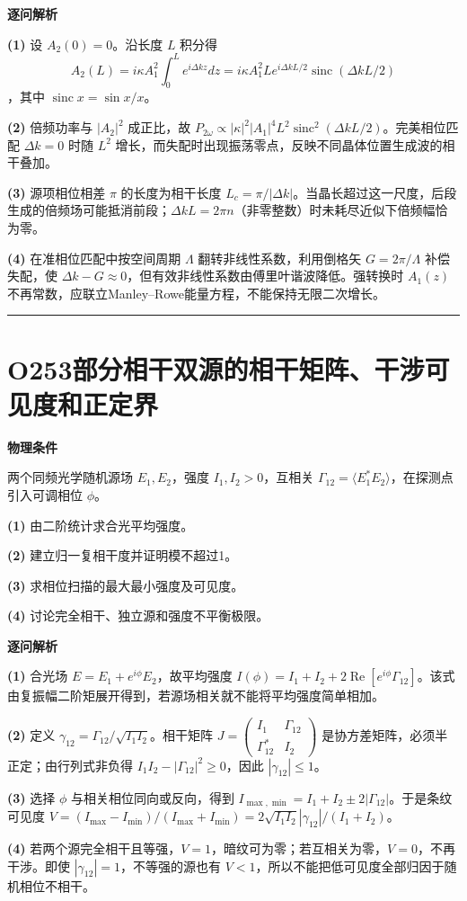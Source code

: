 \documentclass[UTF8,a4paper,11pt,oneside,openany]{ctexbook}
\begin{document}
\par\medskip\noindent\textbf{逐问解析}
\par\noindent\textbf{(1)} 设 \(A_2(0)=0\)。沿长度 \(L\) 积分得 \[A_2(L)=i\kappa A_1^2\int_0^L e^{i\Delta kz}dz=i\kappa A_1^2 L e^{i\Delta kL/2}\operatorname{sinc}(\Delta kL/2)\]，其中 \(\operatorname{sinc}x=\sin x/x\)。
\par\noindent\textbf{(2)} 倍频功率与 \(|A_2|^2\) 成正比，故 \(P_{2\omega}\propto|\kappa|^2|A_1|^4L^2\operatorname{sinc}^2(\Delta kL/2)\)。完美相位匹配 \(\Delta k=0\) 时随 \(L^2\) 增长，而失配时出现振荡零点，反映不同晶体位置生成波的相干叠加。
\par\noindent\textbf{(3)} 源项相位相差 \(\pi\) 的长度为相干长度 \(L_c=\pi/|\Delta k|\)。当晶长超过这一尺度，后段生成的倍频场可能抵消前段；\(\Delta kL=2\pi n\)（非零整数）时未耗尽近似下倍频幅恰为零。
\par\noindent\textbf{(4)} 在准相位匹配中按空间周期 \(\Lambda\) 翻转非线性系数，利用倒格矢 \(G=2\pi/\Lambda\) 补偿失配，使 \(\Delta k-G\approx0\)，但有效非线性系数由傅里叶谐波降低。强转换时 \(A_1(z)\) 不再常数，应联立Manley–Rowe能量方程，不能保持无限二次增长。

\par\bigskip\hrule\bigskip
\section*{O253\quad 部分相干双源的相干矩阵、干涉可见度和正定界}
\textbf{物理条件}\par 两个同频光学随机源场 \(E_1,E_2\)，强度 \(I_1,I_2>0\)，互相关 \(\Gamma_{12}=\langle E_1^*E_2\rangle\)，在探测点引入可调相位 \(\phi\)。
\par\noindent\textbf{(1)} 由二阶统计求合光平均强度。
\par\noindent\textbf{(2)} 建立归一复相干度并证明模不超过1。
\par\noindent\textbf{(3)} 求相位扫描的最大最小强度及可见度。
\par\noindent\textbf{(4)} 讨论完全相干、独立源和强度不平衡极限。

\par\medskip\noindent\textbf{逐问解析}
\par\noindent\textbf{(1)} 合光场 \(E=E_1+e^{i\phi}E_2\)，故平均强度 \(I(\phi)=I_1+I_2+2\operatorname{Re}[e^{i\phi}\Gamma_{12}]\)。该式由复振幅二阶矩展开得到，若源场相关就不能将平均强度简单相加。
\par\noindent\textbf{(2)} 定义 \(\gamma_{12}=\Gamma_{12}/\sqrt{I_1I_2}\)。相干矩阵 \(J=\begin{pmatrix}I_1&\Gamma_{12}\\\Gamma_{12}^*&I_2\end{pmatrix}\) 是协方差矩阵，必须半正定；由行列式非负得 \(I_1I_2-|\Gamma_{12}|^2\ge0\)，因此 \(|\gamma_{12}|\le1\)。
\par\noindent\textbf{(3)} 选择 \(\phi\) 与相关相位同向或反向，得到 \(I_{\max,\min}=I_1+I_2\pm2|\Gamma_{12}|\)。于是条纹可见度 \(V=(I_{\max}-I_{\min})/(I_{\max}+I_{\min})=2\sqrt{I_1I_2}|\gamma_{12}|/(I_1+I_2)\)。
\par\noindent\textbf{(4)} 若两个源完全相干且等强，\(V=1\)，暗纹可为零；若互相关为零，\(V=0\)，不再干涉。即使 \(|\gamma_{12}|=1\)，不等强的源也有 \(V<1\)，所以不能把低可见度全部归因于随机相位不相干。
\end{document}
